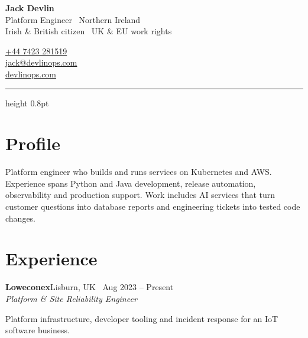 \documentclass[a4paper,10pt]{article}
\newcommand{\role}[4]{%
  \par\vspace{4pt}\noindent
  {\bfseries #1}\hfill\textcolor{muted}{#3 \textperiodcentered\ #4}\\[1pt]
  \textit{#2}\par
  \vspace{2pt}
}
\begin{document}
\pagestyle{empty}
\RaggedRight

\noindent
\begin{minipage}[b]{0.66\textwidth}
  {\fontsize{24pt}{27pt}\selectfont\bfseries Jack Devlin}\\[5pt]
  \textcolor{muted}{Platform Engineer \textperiodcentered\ Northern Ireland}\\[2pt]
  \textcolor{muted}{\small Irish \& British citizen \textperiodcentered\ UK \& EU work rights}
\end{minipage}%
\hfill
\begin{minipage}[b]{0.30\textwidth}
  \RaggedLeft\small
  \href{tel:+447423281519}{+44 7423 281519}\\[2pt]
  \href{mailto:jack@devlinops.com}{jack@devlinops.com}\\[2pt]
  \href{https://devlinops.com}{devlinops.com}
\end{minipage}
\par\vspace{7pt}
{\color{accent}\hrule height 0.8pt}

\section*{Profile}
Platform engineer who builds and runs services on Kubernetes and AWS. Experience spans Python and Java development, release automation, observability and production support. Work includes AI services that turn customer questions into database reports and engineering tickets into tested code changes.

\section*{Experience}
\role{Loweconex}{Platform \& Site Reliability Engineer}{Lisburn, UK}{Aug 2023 -- Present}
{\small\textcolor{muted}{Platform infrastructure, developer tooling and incident response for an IoT software business.}}
\vspace{4pt}
\end{document}
